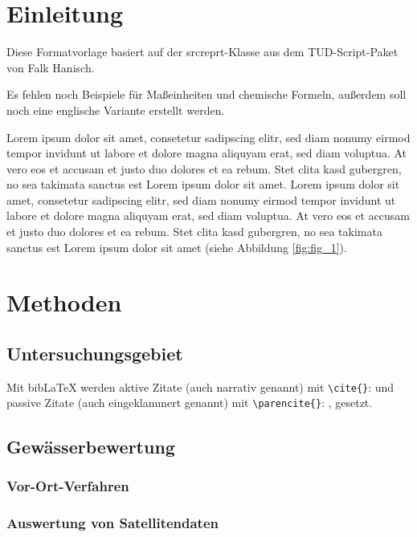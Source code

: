 \documentclass[english,ngerman,BCOR=6mm,cdgeometry=no,DIV=13]{tudscrreprt}
\begin{document}
\chapter{Einleitung}

Diese Formatvorlage basiert auf der srcreprt-Klasse aus dem TUD-Script-Paket von
Falk Hanisch.

Es fehlen noch Beispiele für Maßeinheiten und chemische Formeln, außerdem soll
noch eine englische Variante erstellt werden.

Lorem ipsum dolor sit amet, consetetur sadipscing elitr, sed diam nonumy eirmod
tempor invidunt ut labore et dolore magna aliquyam erat, sed diam voluptua. At
vero eos et accusam et justo duo dolores et ea rebum. Stet clita kasd gubergren,
no sea takimata sanctus est Lorem ipsum dolor sit amet. Lorem ipsum dolor sit
amet, consetetur sadipscing elitr, sed diam nonumy eirmod tempor invidunt ut
labore et dolore magna aliquyam erat, sed diam voluptua. At vero eos et accusam
et justo duo dolores et ea rebum. Stet clita kasd gubergren, no sea takimata
sanctus est Lorem ipsum dolor sit amet (siehe Abbildung \ref{fig:fig_1}).

\chapter{Methoden}

\section{Untersuchungsgebiet}

Mit bibLaTeX werden aktive Zitate (auch narrativ genannt) mit \texttt{\textbackslash cite\{\}}: \cite{r-core-2024} und passive Zitate (auch eingeklammert genannt) mit \texttt{\textbackslash parencite\{\}}: \parencite{r-core-2024}, gesetzt.

\section{Gewässerbewertung}

\subsection{Vor-Ort-Verfahren}

\subsection{Auswertung von Satellitendaten}
\end{document}
